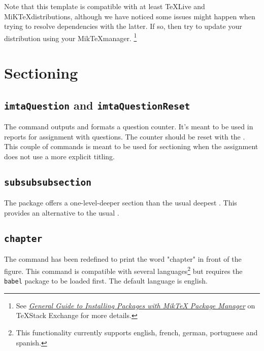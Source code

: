 \documentclass{report}
\begin{document}
Note that this template is compatible with at least \TeX Live and MiK\TeX distributions, although we have noticed some issues might happen when trying to resolve dependencies with the latter. 
If so, then try to update your distribution using your Mik\TeX manager.
\footnote{See \textit{\href{https://tex.stackexchange.com/a/359851}{General Guide to Installing Packages with MikTeX Package Manager}} on \TeX Stack Exchange for more details.}



\section{Sectioning}


\subsection{\texttt{imtaQuestion} and \texttt{imtaQuestionReset}}
The  command outputs and formats a question counter.
It's meant to be used in reports for assignment with questions.
The counter should be reset with the .
This couple of commands is meant to be used for sectioning when the assignment does not use a more explicit titling.


\subsection{\texttt{subsubsubsection}}
The  package offers a one-level-deeper section than the usual deepest .
This provides an alternative to the usual .


\subsection{\texttt{chapter}}
The  command has been redefined to print the word "chapter" in front of the figure. 
This command is compatible with several languages\footnote{This functionality currently supports english, french, german, portuguese and spanish.} but requires the \texttt{babel} package to be loaded first. 
The default language is english.
\end{document}
